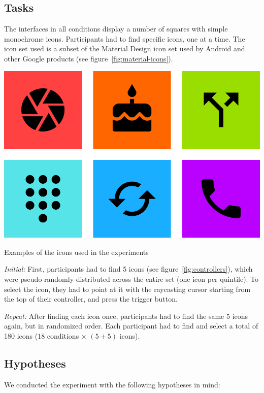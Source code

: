 \documentclass[nobib]{tufte-book} %
\begin{document}
\subsection{Tasks}
The interfaces in all conditions display a number of squares with simple monochrome icons. Participants had to find specific icons, one at a time. The icon set used is a subset of the Material Design icon set used by Android and other Google products (see figure~\ref{fig:material-icons}).

\begin{marginfigure}
  \includegraphics[width=\linewidth]{material-icons.png}
  \caption{Examples of the icons used in the experiments}
  \label{fig:material-icons}
\end{marginfigure}

\emph{Initial:} First, participants had to find 5 icons (see figure~\ref{fig:controllers}), which were pseudo-randomly distributed across the entire set (one icon per quintile). To select the icon, they had to point at it with the raycasting cursor starting from the top of their controller, and press the trigger button.

\emph{Repeat:} After finding each icon once, participants had to find the same 5 icons again, but in randomized order. Each participant had to find and select a total of 180 icons ($18$ conditions $\times$ $(5 + 5) $ icons).

\subsection{Hypotheses}
We conducted the experiment with the following hypotheses in mind:
\end{document}
